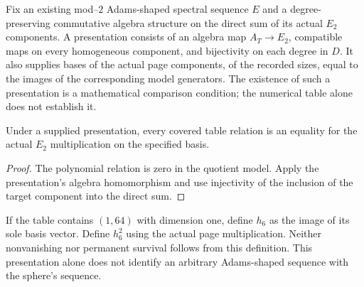 \begin{definition}
  \label{def:adams-e2-table-presentation}
  \leanok
  Fix an existing mod--$2$ Adams-shaped spectral sequence $E$ and a
  degree-preserving commutative algebra structure on the direct sum of its
  actual $E_2$ components.  A presentation consists of an algebra map
  $A_T\to E_2$, compatible maps on every homogeneous component, and
  bijectivity on each degree in $D$.  It also supplies bases of the actual
  page components, of the recorded sizes, equal to the images of the
  corresponding model generators.  The existence of such a presentation is a mathematical
  comparison condition; the numerical table alone does not establish it.
\end{definition}

\begin{lemma}
  \label{lem:adams-e2-table-product}
  \leanok
  Under a supplied presentation, every covered table relation is an
  equality for the actual $E_2$ multiplication on the specified basis.
\end{lemma}
\begin{proof}
  \leanok
  The polynomial relation is zero in the quotient model.  Apply the
  presentation's algebra homomorphism and use injectivity of the inclusion
  of the target component into the direct sum.
\end{proof}

\begin{definition}
  \label{def:adams-e2-imported-h6}
  \leanok
  If the table contains $(1,64)$ with dimension one, define $h_6$ as the
  image of its sole basis vector.  Define $h_6^2$ using the actual page
  multiplication.  Neither nonvanishing nor permanent survival follows from this
  definition.  This presentation alone does not identify an arbitrary
  Adams-shaped sequence with the sphere's sequence.
\end{definition}

